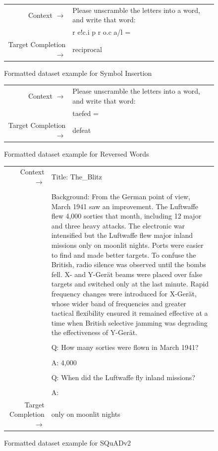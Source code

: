 \documentclass{article}
\begin{document}
\begin{figure} { \tt \footnotesize \begin{tabularx}{\linewidth}{r X} \toprule Context $\to$ & Please unscramble the letters into a word, and write that word: \\
& r e!c.i p r o.c a/l = \\ 
 \midrule Target Completion $\to$ & reciprocal\\ \bottomrule \end{tabularx} }  \caption{Formatted dataset example for Symbol Insertion}  \label{eval:RI}  \end{figure}
\begin{figure} { \tt \footnotesize \begin{tabularx}{\linewidth}{r X} \toprule Context $\to$ & Please unscramble the letters into a word, and write that word:\\
& taefed = \\ 
 \midrule Target Completion $\to$ & defeat\\ \bottomrule \end{tabularx} }  \caption{Formatted dataset example for Reversed Words}  \label{eval:RW}  \end{figure}
\begin{figure} { \tt \footnotesize \begin{tabularx}{\linewidth}{r X} \toprule Context $\to$ & Title: The\_Blitz \\ 
 &  \\ 
 & Background: From the German point of view, March 1941 saw an improvement. The Luftwaffe flew 4,000 sorties that month, including 12 major and three heavy attacks. The electronic war intensified but the Luftwaffe flew major inland missions only on moonlit nights. Ports were easier to find and made better targets. To confuse the British, radio silence was observed until the bombs fell. X- and Y-Ger\"at beams were placed over false targets and switched only at the last minute. Rapid frequency changes were introduced for X-Ger\"at, whose wider band of frequencies and greater tactical flexibility ensured it remained effective at a time when British selective jamming was degrading the effectiveness of Y-Ger\"at. \\ 
 &  \\ 
 & Q: How many sorties were flown in March 1941? \\ 
 &  \\ 
 & A: 4,000 \\ 
 &  \\ 
 & Q: When did the Luftwaffe fly inland missions? \\ 
 &  \\ 
 & A: \\ 
 \midrule Target Completion $\to$ & only on moonlit nights \\
\bottomrule \end{tabularx} }  \caption{Formatted dataset example for SQuADv2}  \label{eval:SQuADv2}  \end{figure}
\end{document}
